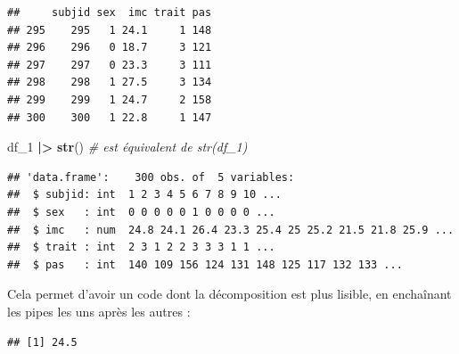 \documentclass[
]{book}
\newenvironment{Shaded}{\begin{snugshade}}{\end{snugshade}}
\newcommand{\AttributeTok}[1]{\textcolor[rgb]{0.13,0.29,0.53}{#1}}
\newcommand{\CommentTok}[1]{\textcolor[rgb]{0.56,0.35,0.01}{\textit{#1}}}
\newcommand{\ConstantTok}[1]{\textcolor[rgb]{0.56,0.35,0.01}{#1}}
\newcommand{\DecValTok}[1]{\textcolor[rgb]{0.00,0.00,0.81}{#1}}
\newcommand{\FunctionTok}[1]{\textcolor[rgb]{0.13,0.29,0.53}{\textbf{#1}}}
\newcommand{\NormalTok}[1]{#1}
\newcommand{\SpecialCharTok}[1]{\textcolor[rgb]{0.81,0.36,0.00}{\textbf{#1}}}
\begin{document}
\begin{verbatim}
##     subjid sex  imc trait pas
## 295    295   1 24.1     1 148
## 296    296   0 18.7     3 121
## 297    297   0 23.3     3 111
## 298    298   1 27.5     3 134
## 299    299   1 24.7     2 158
## 300    300   1 22.8     1 147
\end{verbatim}

\begin{Shaded}
\begin{Highlighting}[]
\NormalTok{df\_1 }\SpecialCharTok{|\textgreater{}} \FunctionTok{str}\NormalTok{() }\CommentTok{\# est équivalent de str(df\_1)}
\end{Highlighting}
\end{Shaded}

\begin{verbatim}
## 'data.frame':    300 obs. of  5 variables:
##  $ subjid: int  1 2 3 4 5 6 7 8 9 10 ...
##  $ sex   : int  0 0 0 0 0 1 0 0 0 0 ...
##  $ imc   : num  24.8 24.1 26.4 23.3 25.4 25 25.2 21.5 21.8 25.9 ...
##  $ trait : int  2 3 1 2 2 3 3 3 1 1 ...
##  $ pas   : int  140 109 156 124 131 148 125 117 132 133 ...
\end{verbatim}

Cela permet d'avoir un code dont la décomposition est plus lisible, en enchaînant les pipes les uns après les autres :

\begin{Shaded}
\end{Shaded}

\begin{verbatim}
## [1] 24.5
\end{verbatim}

\begin{Shaded}
\end{Shaded}
\end{document}
